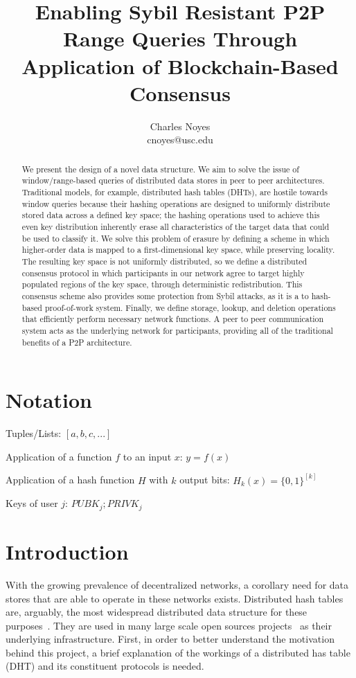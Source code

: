 \documentclass[10pt]{IEEEtran}
\title{Enabling Sybil Resistant P2P Range Queries Through Application of Blockchain-Based Consensus}
\author{Charles Noyes \\ cnoyes@usc.edu}
\date{\vspace{-5ex}}
\begin{document}
\maketitle

\begin{abstract}
We present the design of a novel data structure. We aim to solve the issue of window/range-based queries of distributed data stores in peer to peer architectures. Traditional models, for example, distributed hash tables (DHTs), are hostile towards window queries because their hashing operations are designed to uniformly distribute stored data across a defined key space; the hashing operations used to achieve this even key distribution inherently erase all characteristics of the target data that could be used to classify it. We solve this problem of erasure by defining a scheme in which higher-order data is mapped to a first-dimensional key space, while preserving locality. The resulting key space is not uniformly distributed, so we define a distributed consensus protocol in which participants in our network agree to target highly populated regions of the key space, through deterministic redistribution. This consensus scheme also provides some protection from Sybil attacks, as it is a to hash-based proof-of-work system. Finally, we define storage, lookup, and deletion operations that efficiently perform necessary network functions. A peer to peer communication system acts as the underlying network for participants, providing all of the traditional benefits of a P2P architecture.
\end{abstract}


\section{Notation}

\noindent Tuples/Lists: $[a,b,c,...]$

\noindent Application of a function $f$ to an input $x$: $y=f(x)$

\noindent Application of a hash function $H$ with $k$ output bits: $H_{k}(x) = \{0,1\}^{[k]}$

\noindent Keys of user $j$: $ PUBK_j; PRIVK_j $

 
\section{Introduction}
\par With the growing prevalence of decentralized networks, a corollary need for data stores that are able to operate in these networks exists. Distributed hash tables are, arguably, the most widespread distributed data structure for these purposes~\cite{Stoica:2001dj,Rowstron:2001ea,Ratnasamy:2001wn}. They are used in many large scale open sources projects~\cite{Freitas:2013tb,Xu:2010vs,Perfitt:2010fh} as their underlying infrastructure. First, in order to better understand the motivation behind this project, a brief explanation of the workings of a distributed has table (DHT) and its constituent protocols is needed.
\end{document}
